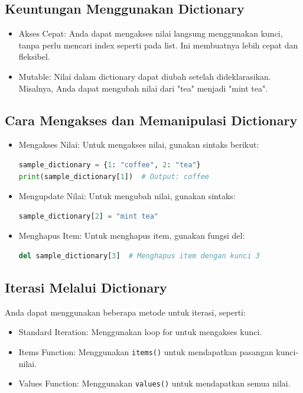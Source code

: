 \documentclass{article}
\begin{document}
\subsection{Keuntungan Menggunakan Dictionary}
\begin{itemize}
    \item Akses Cepat: Anda dapat mengakses nilai langsung menggunakan kunci, tanpa perlu mencari index seperti pada list. Ini membuatnya lebih cepat dan fleksibel.
    \item Mutable: Nilai dalam dictionary dapat diubah setelah dideklarasikan. Misalnya, Anda dapat mengubah nilai dari "tea" menjadi "mint tea".
\end{itemize}

\subsection{Cara Mengakses dan Memanipulasi Dictionary}
\begin{itemize}
    \item Mengakses Nilai: Untuk mengakses nilai, gunakan sintaks berikut:
          \begin{lstlisting}[language=Python, caption={}, captionpos=b]
sample_dictionary = {1: "coffee", 2: "tea"}
print(sample_dictionary[1])  # Output: coffee
\end{lstlisting}
    \item Mengupdate Nilai: Untuk mengubah nilai, gunakan sintaks:
          \begin{lstlisting}[language=Python, caption={}, captionpos=b]
sample_dictionary[2] = "mint tea"
\end{lstlisting}
    \item Menghapus Item: Untuk menghapus item, gunakan fungsi del:
          \begin{lstlisting}[language=Python, caption={}, captionpos=b]
del sample_dictionary[3]  # Menghapus item dengan kunci 3
\end{lstlisting}
\end{itemize}

\subsection{Iterasi Melalui Dictionary}
Anda dapat menggunakan beberapa metode untuk iterasi, seperti:
\begin{itemize}
    \item Standard Iteration: Menggunakan loop for untuk mengakses kunci.
    \item Items Function: Menggunakan \verb|items()| untuk mendapatkan pasangan kunci-nilai.
    \item Values Function: Menggunakan \verb|values()| untuk mendapatkan semua nilai.
\end{itemize}
\end{document}
